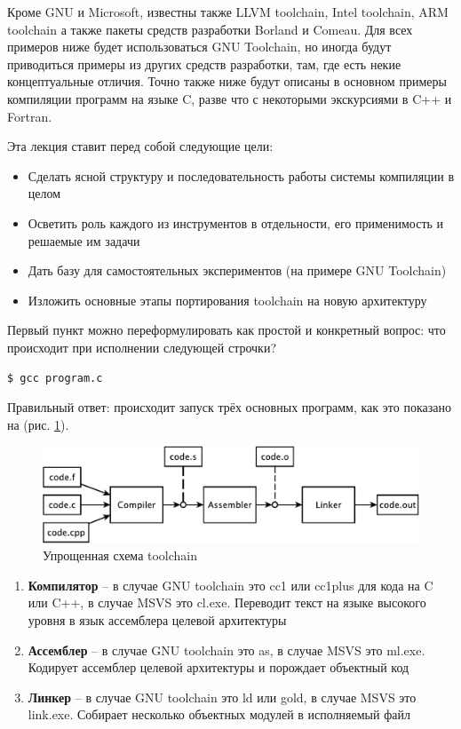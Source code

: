 \documentclass[a4paper,12pt,oneside]{article}
\begin{document}
Кроме GNU и Microsoft, известны также LLVM toolchain, Intel toolchain, ARM toolchain а также пакеты средств разработки Borland и Comeau. Для всех примеров ниже будет использоваться GNU Toolchain, но иногда будут приводиться примеры из других средств разработки, там, где есть некие концептуальные отличия. Точно также ниже будут описаны в основном примеры компиляции программ на языке C, разве что с некоторыми экскурсиями в C++ и Fortran.

Эта лекция ставит перед собой следующие цели:

\begin{itemize}
\item Сделать ясной структуру и последовательность работы системы компиляции в целом
\item Осветить роль каждого из инструментов в отдельности, его применимость и решаемые им задачи
\item Дать базу для самостоятельных экспериментов (на примере GNU Toolchain)
\item Изложить основные этапы портирования toolchain на новую архитектуру
\end{itemize}

Первый пункт можно переформулировать как простой и конкретный вопрос: что происходит при исполнении следующей строчки?

\begin{verbatim}
$ gcc program.c
\end{verbatim}

Правильный ответ: происходит запуск трёх основных программ, как это показано на (рис. \ref{fig:simplified_scheme}).

\begin{figure}[ht]
\centering
\includegraphics[width=1.0\textwidth]{illustrations/simplified-scheme-crop.pdf}
\caption{Упрощенная схема toolchain}
\label{fig:simplified_scheme}
\end{figure}

\begin{enumerate}
\item \textbf{Компилятор} -- в случае GNU toolchain это cc1 или cc1plus для кода на C или C++, в случае MSVS это cl.exe. Переводит текст на языке высокого уровня в язык ассемблера целевой архитектуры
\item \textbf{Ассемблер} -- в случае GNU toolchain это as, в случае MSVS это ml.exe. Кодирует ассемблер целевой архитектуры и порождает объектный код
\item \textbf{Линкер} -- в случае GNU toolchain это ld или gold, в случае MSVS это link.exe. Собирает несколько объектных модулей в исполняемый файл
\end{enumerate}
\end{document}
